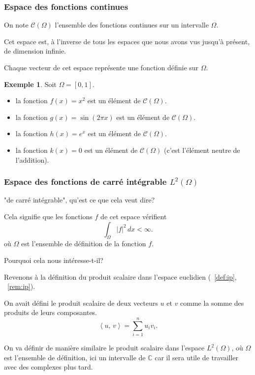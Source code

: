 \documentclass[11pt,a4paper]{article}
\numberwithin{equation}{section}
\theoremstyle{plain}
\theoremstyle{definition}
\newtheorem{example}[theorem]{Exemple}
\theoremstyle{remark}
\newcommand{\C}{\mathbb{C}}
\newcommand{\ip}[2]{\left\langle #1,\, #2\right\rangle}
\begin{document}
\subsubsection{Espace des fonctions continues}

On note $\mathcal{C}(\Omega)$ l'ensemble des fonctions continues sur un intervalle $\Omega$.

Cet espace est, à l'inverse de tous les espaces que nous avons vus jusqu'à présent, de dimension infinie.

Chaque vecteur de cet espace représente une fonction définie sur $\Omega$.

\begin{example}
    Soit $\Omega = [0, 1]$.
    \begin{itemize}
        \item la fonction $f(x) = x^2$ est un élément de $\mathcal{C}(\Omega)$.
        \item la fonction $g(x) = \sin(2\pi x)$ est un élément de $\mathcal{C}(\Omega)$.
        \item la fonction $h(x) = e^x$ est un élément de $\mathcal{C}(\Omega)$.
        \item la fonction $k(x) = 0$ est un élément de $\mathcal{C}(\Omega)$ (c'est l'élément neutre de l'addition).
    \end{itemize}
\end{example}

\subsubsection{Espace des fonctions de carré intégrable $L^2(\Omega)$}

"de carré intégrable", qu'est ce que cela veut dire?

Cela signifie que les fonctions $f$ de cet espace vérifient
\[
    \int_\Omega |f|^2 \, dx < \infty.
\]
où $\Omega$ est l'ensemble de définition de la fonction $f$.

Pourquoi cela nous intéresse-t-il?

Revenons à la définition du produit scalaire dans l'espace euclidien (~\ref{def:ip}, ~\ref{rem:ip}).

On avait défini le produit scalaire de deux vecteurs $u$ et $v$ comme la somme des produits de leurs composantes.
\[
    \ip{u}{v} = \sum_{i=1}^n u_i v_i.
\]

On va définir de manière similaire le produit scalaire dans l'espace $L^2(\Omega)$, où $\Omega$ est l'ensemble de définition, ici un intervalle de $\C$ car il sera utile de travailler avec des complexes plus tard.
\end{document}
